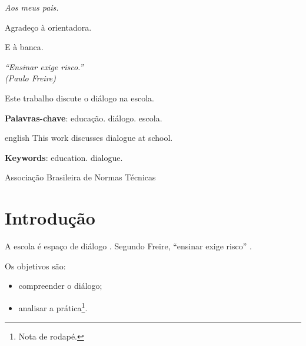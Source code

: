 \documentclass[12pt,openright,oneside,a4paper,chapter=TITLE,english,brazil]{abntex2}
\begin{document}
\pretextual
\imprimircapa
\imprimirfolhaderosto

\begin{dedicatoria}
   \vspace*{\fill}
   \centering
   \noindent
   \textit{Aos meus pais.} \vspace*{\fill}
\end{dedicatoria}

\begin{agradecimentos}
Agradeço à orientadora.

E à banca.
\end{agradecimentos}

\begin{epigrafe}
    \vspace*{\fill}
	\begin{flushright}
		\textit{``Ensinar exige risco.''\\
		(Paulo Freire)}
	\end{flushright}
\end{epigrafe}

\begin{resumo}
 Este trabalho discute o diálogo na escola.

 \textbf{Palavras-chave}: educação. diálogo. escola.
\end{resumo}

\begin{resumo}[Abstract]
 \begin{otherlanguage*}{english}
   This work discusses dialogue at school.

   \vspace{\onelineskip}
   \noindent
   \textbf{Keywords}: education. dialogue.
 \end{otherlanguage*}
\end{resumo}

\begin{siglas}
  \item[ABNT] Associação Brasileira de Normas Técnicas
\end{siglas}

\tableofcontents*
\cleardoublepage

\textual

\chapter{Introdução}
\label{cap:intro}
A escola é espaço de diálogo \cite{freire}. Segundo Freire, ``ensinar exige risco'' \cite[p.~35]{freire}.

Os objetivos são:
\begin{itemize}
  \item compreender o diálogo;
  \item analisar a prática\footnote{Nota de rodapé.}.
\end{itemize}
\end{document}
